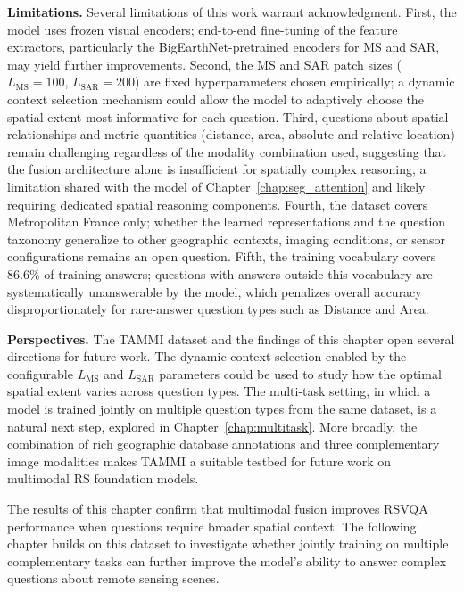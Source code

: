 \textbf{Limitations.}
Several limitations of this work warrant acknowledgment.
First, the model uses frozen visual encoders; end-to-end
fine-tuning of the feature extractors, particularly the
BigEarthNet-pretrained encoders for MS and SAR, may yield
further improvements. Second, the MS and SAR patch sizes
($L_\text{MS} = 100$, $L_\text{SAR} = 200$) are fixed
hyperparameters chosen empirically; a dynamic context
selection mechanism could allow the model to adaptively
choose the spatial extent most informative for each
question. Third, questions about spatial relationships and
metric quantities (distance, area, absolute and relative
location) remain challenging regardless of the modality
combination used, suggesting that the fusion architecture
alone is insufficient for spatially complex reasoning,
a limitation shared with the model of
Chapter~\ref{chap:seg_attention} and likely requiring
dedicated spatial reasoning components. Fourth, the
dataset covers Metropolitan France only; whether the
learned representations and the question taxonomy
generalize to other geographic contexts, imaging
conditions, or sensor configurations remains an open
question. Fifth, the training vocabulary covers 86.6\%
of training answers; questions with answers outside this
vocabulary are systematically unanswerable by the model,
which penalizes overall accuracy disproportionately for
rare-answer question types such as Distance and Area.

\textbf{Perspectives.}
The TAMMI dataset and the findings of this chapter open
several directions for future work. The dynamic context
selection enabled by the configurable $L_\text{MS}$ and
$L_\text{SAR}$ parameters could be used to study how
the optimal spatial extent varies across question types.
The multi-task setting, in which a model is trained
jointly on multiple question types from the same dataset,
is a natural next step, explored in
Chapter~\ref{chap:multitask}. More broadly, the
combination of rich geographic database annotations and
three complementary image modalities makes TAMMI a
suitable testbed for future work on multimodal RS
foundation models.

The results of this chapter confirm that multimodal
fusion improves RSVQA performance when questions require
broader spatial context. The following chapter builds
on this dataset to investigate whether jointly training
on multiple complementary tasks can further improve the
model's ability to answer complex questions about
remote sensing scenes.

